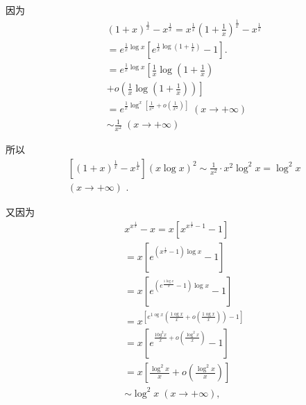 因为
\begin{align*}
	&{\left( 1 + x\right) }^{\frac{1}{x}} - {x}^{\frac{1}{x}} = {x}^{\frac{1}{x}}{\left( 1 + \frac{1}{x}\right) }^{\frac{1}{x}} - {x}^{\frac{1}{x}}\\
	&= {e}^{\frac{1}{x}\log x}\left\lbrack  {{e}^{\frac{1}{x}\log \left( {1 + \frac{1}{x}}\right) } - 1}\right\rbrack  .\\
	&= {e}^{\frac{1}{x}\log x}\left\lbrack  {\frac{1}{x}\log \left( {1 + \frac{1}{x}}\right) }\right.\\
	&\left. {+o\left( {\frac{1}{x}\log \left( {1 + \frac{1}{x}}\right) }\right) }\right\rbrack\\
	&= {e}^{\frac{1}{x}{\log }^{x}\left\lbrack  {\frac{1}{{x}^{2}} + o\left( \frac{1}{{x}^{2}}\right) }\right\rbrack  }\;\left( {x \rightarrow   + \infty }\right)\\
	&\sim  \frac{1}{{x}^{2}}\;\left( {x \rightarrow   + \infty }\right)
\end{align*}

所以
\begin{align*}
	&\left\lbrack  {{\left( 1 + x\right) }^{\frac{1}{x}} - {x}^{\frac{1}{x}}}\right\rbrack  {\left( x\log x\right) }^{2} \sim  \frac{1}{{x}^{2}} \cdot  {x}^{2}{\log }^{2}x = {\log }^{2}x\\
	&\left( {x \rightarrow   + \infty }\right) \text{ . }
\end{align*}

又因为
\begin{align*}
	&{x}^{{x}^{\frac{1}{x}}} - x = x\left\lbrack  {{x}^{{x}^{\frac{1}{x}} - 1} - 1}\right\rbrack\\
	&= x\left\lbrack  {{e}^{\left( {{x}^{\frac{1}{x}} - 1}\right) \log x} - 1}\right\rbrack\\
	&= x\left\lbrack  {{e}^{\left( {{e}^{\frac{1\log x}{x}} - 1}\right) \log x} - 1}\right\rbrack\\
	&= {x}^{\left\lbrack  {e}^{1\operatorname{og}x}\left( \frac{1\operatorname{og}x}{x} + o\left( \frac{1\operatorname{og}x}{x}\right) \right)  - 1\right\rbrack  }\\
	&= x\left\lbrack  {{e}^{\frac{{10}{g}^{2}x}{x} + o\left( \frac{{\log }^{2}x}{x}\right) } - 1}\right\rbrack\\
	&= x\left\lbrack  {\frac{{\log }^{2}x}{x} + o\left( \frac{{\log }^{2}x}{x}\right) }\right\rbrack\\
	&\sim  {\log }^{2}x\;\left( {x \rightarrow   + \infty }\right) ,
\end{align*}

